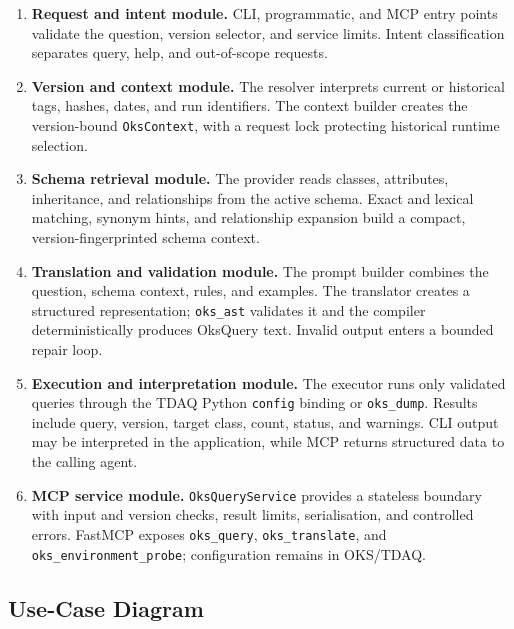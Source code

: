 \documentclass[12pt, a4paper]{report}
\begin{document}
\begin{enumerate}[label=\Roman*., leftmargin=1.1cm]
  \item \textbf{Request and intent module.} CLI, programmatic, and MCP entry
  points validate the question, version selector, and service limits. Intent
  classification separates query, help, and out-of-scope requests.

  \item \textbf{Version and context module.} The resolver interprets current
  or historical tags, hashes, dates, and run identifiers. The context builder
  creates the version-bound \texttt{OksContext}, with a request lock protecting
  historical runtime selection.

  \item \textbf{Schema retrieval module.} The provider reads classes,
  attributes, inheritance, and relationships from the active schema. Exact
  and lexical matching, synonym hints, and relationship expansion build a
  compact, version-fingerprinted schema context.

  \item \textbf{Translation and validation module.} The prompt builder combines
  the question, schema context, rules, and examples. The translator creates a
  structured representation; \texttt{oks\_ast} validates it and the compiler
  deterministically produces OksQuery text. Invalid output enters a bounded
  repair loop.

  \item \textbf{Execution and interpretation module.} The executor runs only
  validated queries through the TDAQ Python \texttt{config} binding or
  \texttt{oks\_dump}. Results include query, version, target class, count,
  status, and warnings. CLI output may be interpreted in the application,
  while MCP returns structured data to the calling agent.

  \item \textbf{MCP service module.} \texttt{OksQueryService} provides a
  stateless boundary with input and version checks, result limits,
  serialisation, and controlled errors. FastMCP exposes
  \texttt{oks\_query}, \texttt{oks\_translate}, and
  \texttt{oks\_environment\_probe}; configuration remains in OKS/TDAQ.
\end{enumerate}

\subsection{Use-Case Diagram}
\end{document}
